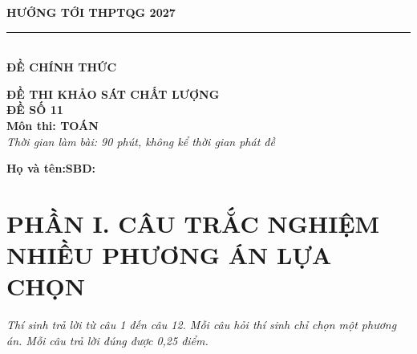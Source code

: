 \documentclass[12pt,a4paper]{article}
\begin{document}
\noindent
\begin{minipage}[t]{0.40\textwidth}
    \centering
    \textbf{HƯỚNG TỚI THPTQG 2027}\\[-2pt]
    \rule{3.2cm}{0.6pt}\\[4pt]
    \textbf{ĐỀ CHÍNH THỨC}
\end{minipage}\hfill
\begin{minipage}[t]{0.58\textwidth}
    \centering
    \textbf{ĐỀ THI KHẢO SÁT CHẤT LƯỢNG}\\
    \textbf{ĐỀ SỐ 11}\\
    \textbf{Môn thi: TOÁN}\\
    \textit{\small Thời gian làm bài: 90 phút, không kể thời gian phát đề}
\end{minipage}

\vspace{0.2cm}
\noindent
\begin{minipage}[b]{0.78\textwidth}
    \textbf{Họ và tên:}\dotfill\textbf{SBD:}\makebox[3.5cm]{\dotfill}
\end{minipage}\hfill
\begin{minipage}[b]{0.20\textwidth}
    \hfill
    \setlength{\fboxrule}{0.8pt}%
\end{minipage}
\vspace{0.2cm}

\section*{\large PHẦN I. CÂU TRẮC NGHIỆM NHIỀU PHƯƠNG ÁN LỰA CHỌN}
\textit{Thí sinh trả lời từ câu 1 đến câu 12. Mỗi câu hỏi thí sinh chỉ chọn một phương án. Mỗi câu trả lời đúng được 0,25 điểm.}
\end{document}
